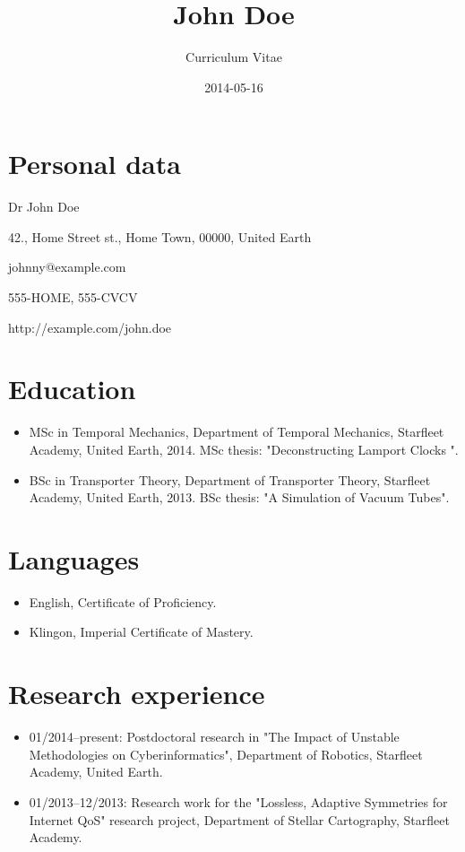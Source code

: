 \documentclass[10pt]{article}
\begin{document}
\title{John Doe}
\author{Curriculum Vitae}
\date{2014-05-16}

\maketitle

\section*{Personal data}

Dr John Doe 

42., Home Street st., Home Town, 00000, United Earth

johnny@example.com

555-HOME, 555-CVCV

http://example.com/john.doe

\section*{Education}

\begin{itemize}
  \item MSc in Temporal Mechanics, Department of Temporal Mechanics, Starfleet Academy, United Earth, 2014. MSc thesis: "Deconstructing Lamport Clocks ".
  \item BSc in Transporter Theory, Department of Transporter Theory, Starfleet Academy, United Earth, 2013. BSc thesis: "A Simulation of Vacuum Tubes".
\end{itemize}

\section*{Languages}

\begin{itemize}
  \item English, Certificate of Proficiency.
  \item Klingon, Imperial Certificate of Mastery.
\end{itemize}

\section*{Research experience}

\begin{itemize}
  \item 01/2014--present: Postdoctoral research in "The Impact of Unstable Methodologies on Cyberinformatics", Department of Robotics, Starfleet Academy, United Earth.
  \item 01/2013--12/2013: Research work for the "Lossless, Adaptive Symmetries for Internet QoS" research project, Department of Stellar Cartography, Starfleet Academy.
\end{itemize}
\end{document}
